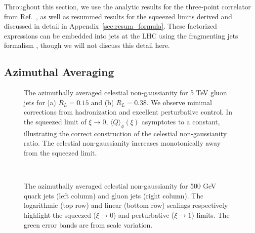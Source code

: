 \documentclass[letterpaper,11pt]{article}
\def\App#1{Appendix~\ref{#1}}
\def\to{\rightarrow}
\DeclareRobustCommand{\App}[1]{App.~\ref{#1}}
\DeclareRobustCommand{\Ref}[1]{Ref.~\cite{#1}}
\begin{document}
Throughout this section, we use the analytic results for the three-point correlator from \Ref{Chen:2019bpb}, as well as resummed results for the squeezed limits derived and discussed in detail in \App{sec:resum_formula}.
%
These factorized expressions can be embedded into jets at the LHC using the fragmenting jets formalism \cite{Procura:2009vm,Kang:2016ehg,Kang:2016mcy}, though we will not discuss this detail here. 


\subsection{Azimuthal Averaging}
\label{sec:blocks}


\begin{figure}
\begin{center}
\qquad
{}\qquad
\end{center}
\caption{
%
The azimuthally averaged celestial non-gaussianity for 5 TeV gluon jets for (a) $R_L = 0.15$ and (b) $R_L = 0.38$. 
%
We observe minimal corrections from hadronization and excellent perturbative control.
%
In the squeezed limit of $\xi \to 0$, $\langle Q \rangle_\phi (\xi)$ asymptotes to a constant, illustrating the correct construction of the celestial non-gaussianity ratio.
%
The celestial non-gaussianity increases monotonically away from the squeezed limit.}
\label{fig:azi_5TeV}
\end{figure}


\begin{figure}
\begin{center}
\qquad
{}\\
\qquad
{}
\end{center}
\caption{
%
The azimuthally averaged celestial non-gaussianity for 500 GeV quark jets (left column) and gluon jets (right column).
%
The logarithmic (top row) and linear (bottom row) scalings respectively highlight the squeezed ($\xi\to 0$) and perturbative ($\xi\to 1$) limits.
%
The green error bands are from scale variation.
}
\label{fig:azi_500GeV}
\end{figure}
\end{document}
